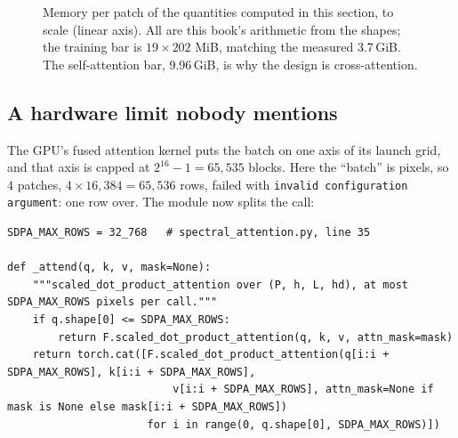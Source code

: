 \begin{figure}[htbp]\centering
{}
\caption{Memory per patch of the quantities computed in this section, to scale (linear axis). All are this book's arithmetic from the shapes; the training bar is $19\times202$ MiB, matching the measured 3.7\,GiB. The self-attention bar, 9.96\,GiB, is why the design is cross-attention.}\label{fig:crossstem:memorybars}
\end{figure}

\subsection{A hardware limit nobody mentions}\label{sec:crossstem:chunk}

The GPU's fused attention kernel puts the batch on one axis of its launch grid, and that axis is capped at $2^{16} - 1 = 65{,}535$ blocks. Here the ``batch'' is pixels, so 4 patches, $4\times16{,}384 = 65{,}536$ rows, failed with \texttt{invalid configuration argument}: one row over. The module now splits the call:

\begin{lstlisting}
SDPA_MAX_ROWS = 32_768   # spectral_attention.py, line 35

def _attend(q, k, v, mask=None):
    """scaled_dot_product_attention over (P, h, L, hd), at most SDPA_MAX_ROWS pixels per call."""
    if q.shape[0] <= SDPA_MAX_ROWS:
        return F.scaled_dot_product_attention(q, k, v, attn_mask=mask)
    return torch.cat([F.scaled_dot_product_attention(q[i:i + SDPA_MAX_ROWS], k[i:i + SDPA_MAX_ROWS],
                          v[i:i + SDPA_MAX_ROWS], attn_mask=None if mask is None else mask[i:i + SDPA_MAX_ROWS])
                      for i in range(0, q.shape[0], SDPA_MAX_ROWS)])
\end{lstlisting}

